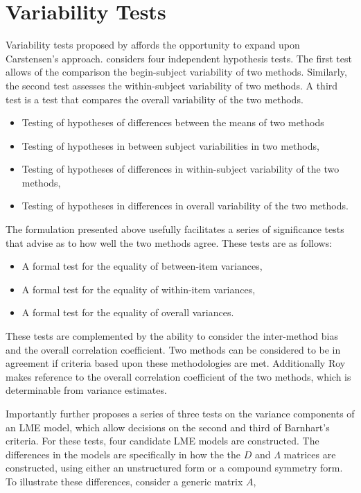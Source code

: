 \documentclass[12pt, a4paper]{report}
\theoremstyle{plain}
\theoremstyle{definition}
\theoremstyle{remark}
\begin{document}

\section{Variability Tests}


Variability tests proposed by \citet{ARoy2009} affords the opportunity to expand upon Carstensen's approach. \citet{ARoy2009} considers four independent hypothesis tests. The first test allows of the comparison the begin-subject variability of two methods. Similarly, the second test assesses the within-subject variability of two methods. A third test is a test that compares the overall variability of the two methods.
\begin{itemize}
	\item Testing of hypotheses of differences between the means of
	two methods\item Testing of hypotheses in between subject
	variabilities in two methods, \item Testing of hypotheses of
	differences in within-subject variability of the two methods,
	\item Testing of hypotheses in differences in overall variability
	of the two methods.
\end{itemize}


The formulation presented above usefully facilitates a series of
significance tests that advise as to how well the two methods
agree. These tests are as follows:
\begin{itemize}
	\item A formal test for the equality of between-item variances,
	\item A formal test for the equality of within-item variances,
	\item A formal test for the equality of overall variances.
\end{itemize}
These tests are complemented by the ability to consider the inter-method bias and the overall correlation coefficient. Two methods can be considered to be in agreement if criteria based upon these methodologies are met. Additionally Roy makes reference to the overall correlation coefficient of the two methods, which is determinable from variance estimates.


Importantly \citet{ARoy2009} further proposes a series of three tests on the variance components of an LME model, which allow decisions on the second and third of Barnhart's criteria. For these tests, four candidate LME models are constructed. The differences in the models are specifically in how the the $D$ and $\Lambda$ matrices are constructed, using either an unstructured form or a compound symmetry form. To illustrate these differences, consider a generic matrix $A$,
\end{document}
